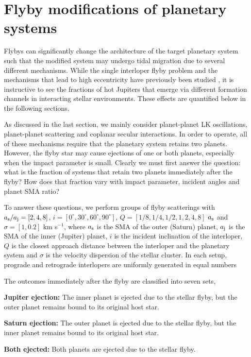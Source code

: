 \documentclass[twocolumn]{aastex63}
\begin{document}
\section{Flyby modifications of planetary systems}\label{sec:flyby}
Flybys can significantly change the architecture of the target planetary system such that the modified system may undergo tidal migration due to several different mechanisms. While the single interloper flyby problem and the mechanisms that lead to high eccentricity have previously been studied \citep[e.g.][]{hamers19a,hamers19b}, it is instructive to see the fractions of hot Jupiters that emerge via different formation channels in interacting stellar environments.  These effects are quantified below in the following sections.

As discussed in the last section, we mainly consider planet-planet LK oscillations, planet-planet scattering and coplanar secular interactions. In order to operate, all of these mechanisms require that the planetary system retains two planets. However, the flyby star may cause ejections of one or both planets, especially when the impact parameter is small. Clearly we must first answer the question: what is the fraction of systems that retain two planets immediately after the flyby? How does that fraction vary with impact parameter, incident angles and planet SMA ratio? 

To answer these questions, we perform groups of flyby scatterings with $a_{\rm s}/a_{\rm j}=[2,4,8]$, $i=[0^\circ, 30^\circ, 60^\circ, 90^\circ]$, $Q=[1/8, 1/4, 1/2, 1, 2, 4, 8]$ $a_{\rm s}$ and $\sigma=[1,0.2]$ km s$^{-1}$, where $a_{\rm s}$ is the SMA of the outer (Saturn) planet, $a_{\rm j}$ is the SMA of the inner (Jupiter) planet, $i$ is the incident inclination of the interloper, $Q$ is the closest approach distance between the interloper and the planetary system and $\sigma$ is the velocity dispersion of the stellar cluster. In each setup, prograde and retrograde interlopers are uniformly generated in equal numbers

The outcomes immediately after the flyby are classified into seven sets,

\textbf{Jupiter ejection:} The inner planet is ejected due to the stellar flyby, but the outer planet remains bound to its original host star.

\textbf{Saturn ejection:} The outer planet is ejected due to the stellar flyby, but the inner planet remains bound to its original host star.

\textbf{Both ejected:} Both  planets are ejected due to the stellar flyby.
\end{document}
